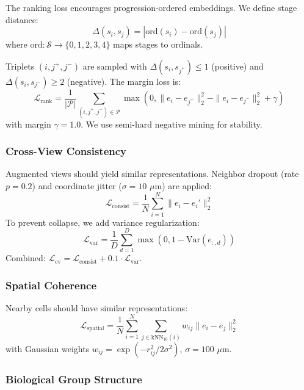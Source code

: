 The ranking loss encourages progression-ordered embeddings. We define stage distance:
\begin{equation}
    \Delta(s_i, s_j) = |\text{ord}(s_i) - \text{ord}(s_j)|
\end{equation}
where $\text{ord}: \mathcal{S} \to \{0,1,2,3,4\}$ maps stages to ordinals.

Triplets $(i, j^+, j^-)$ are sampled with $\Delta(s_i, s_{j^+}) \leq 1$ (positive) and $\Delta(s_i, s_{j^-}) \geq 2$ (negative). The margin loss is:
\begin{equation}
    \mathcal{L}_{\text{rank}} = \frac{1}{|\mathcal{P}|} \sum_{(i,j^+,j^-) \in \mathcal{P}} \max(0, \|e_i - e_{j^+}\|_2^2 - \|e_i - e_{j^-}\|_2^2 + \gamma)
\end{equation}
with margin $\gamma = 1.0$. We use semi-hard negative mining for stability.

\subsubsection{Cross-View Consistency}

Augmented views should yield similar representations. Neighbor dropout (rate $p = 0.2$) and coordinate jitter ($\sigma = 10$ $\mu$m) are applied:
\begin{equation}
    \mathcal{L}_{\text{consist}} = \frac{1}{N} \sum_{i=1}^{N} \|e_i - e_i'\|_2^2
\end{equation}
To prevent collapse, we add variance regularization:
\begin{equation}
    \mathcal{L}_{\text{var}} = \frac{1}{D} \sum_{d=1}^{D} \max(0, 1 - \text{Var}(e_{:,d}))
\end{equation}
Combined: $\mathcal{L}_{\text{cv}} = \mathcal{L}_{\text{consist}} + 0.1 \cdot \mathcal{L}_{\text{var}}$.

\subsubsection{Spatial Coherence}

Nearby cells should have similar representations:
\begin{equation}
    \mathcal{L}_{\text{spatial}} = \frac{1}{N} \sum_{i=1}^{N} \sum_{j \in \text{kNN}_{10}(i)} w_{ij} \|e_i - e_j\|_2^2
\end{equation}
with Gaussian weights $w_{ij} = \exp(-r_{ij}^2 / 2\sigma^2)$, $\sigma = 100$ $\mu$m.

\subsubsection{Biological Group Structure}

